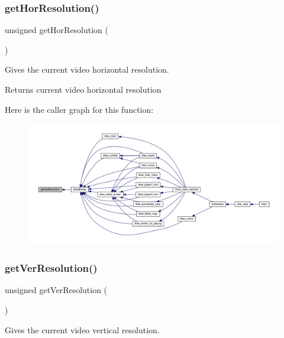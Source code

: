 \subsubsection{\texorpdfstring{get\+Hor\+Resolution()}{getHorResolution()}}
{\footnotesize\ttfamily unsigned get\+Hor\+Resolution (\begin{DoxyParamCaption}{ }\end{DoxyParamCaption})}



Gives the current video horizontal resolution. 

\begin{DoxyReturn}{Returns}
current video horizontal resolution 
\end{DoxyReturn}
Here is the caller graph for this function\+:\nopagebreak
\begin{figure}[H]
\begin{center}
\leavevmode
\includegraphics[width=350pt]{group__video__gr_gae2b9b38f4f97e1c580123c8e9a993353_icgraph}
\end{center}
\end{figure}
\mbox{\label{group__video__gr_ga7ee85b0f333d227380a2c43e5fb8507a}} 
\subsubsection{\texorpdfstring{get\+Ver\+Resolution()}{getVerResolution()}}
{\footnotesize\ttfamily unsigned get\+Ver\+Resolution (\begin{DoxyParamCaption}{ }\end{DoxyParamCaption})}



Gives the current video vertical resolution. 

